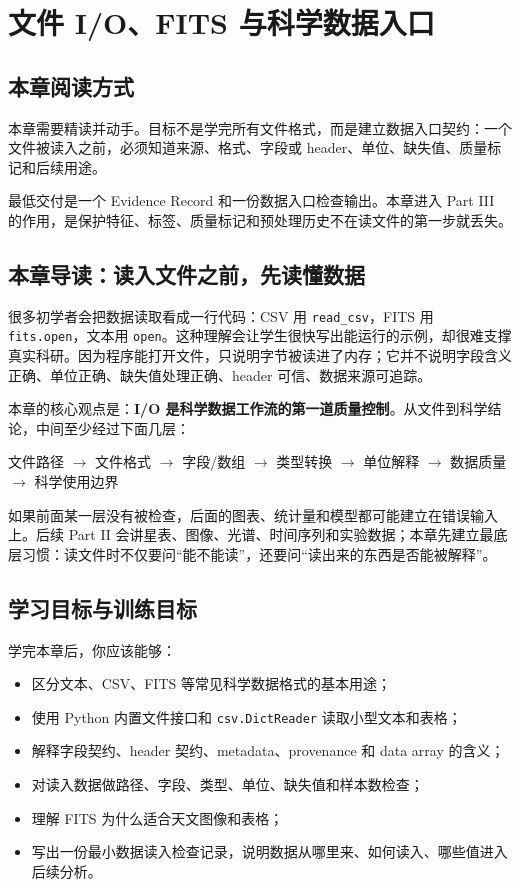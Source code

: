\chapter{文件 I/O、FITS 与科学数据入口}

\section{本章阅读方式}

本章需要精读并动手。目标不是学完所有文件格式，而是建立数据入口契约：一个文件被读入之前，必须知道来源、格式、字段或 header、单位、缺失值、质量标记和后续用途。

最低交付是一个 Evidence Record 和一份数据入口检查输出。本章进入 Part III 的作用，是保护特征、标签、质量标记和预处理历史不在读文件的第一步就丢失。

\section{本章导读：读入文件之前，先读懂数据}

很多初学者会把数据读取看成一行代码：CSV 用 \texttt{read\_csv}，FITS 用 \texttt{fits.open}，文本用 \texttt{open}。这种理解会让学生很快写出能运行的示例，却很难支撑真实科研。因为程序能打开文件，只说明字节被读进了内存；它并不说明字段含义正确、单位正确、缺失值处理正确、header 可信、数据来源可追踪。

本章的核心观点是：\textbf{I/O 是科学数据工作流的第一道质量控制}。从文件到科学结论，中间至少经过下面几层：

\begin{center}
文件路径 $\rightarrow$ 文件格式 $\rightarrow$ 字段/数组 $\rightarrow$ 类型转换 $\rightarrow$ 单位解释 $\rightarrow$ 数据质量 $\rightarrow$ 科学使用边界
\end{center}

如果前面某一层没有被检查，后面的图表、统计量和模型都可能建立在错误输入上。后续 Part II 会讲星表、图像、光谱、时间序列和实验数据；本章先建立最底层习惯：读文件时不仅要问“能不能读”，还要问“读出来的东西是否能被解释”。

\section{学习目标与训练目标}

学完本章后，你应该能够：

\begin{itemize}
    \item 区分文本、CSV、FITS 等常见科学数据格式的基本用途；
    \item 使用 Python 内置文件接口和 \texttt{csv.DictReader} 读取小型文本和表格；
    \item 解释字段契约、header 契约、metadata、provenance 和 data array 的含义；
    \item 对读入数据做路径、字段、类型、单位、缺失值和样本数检查；
    \item 理解 FITS 为什么适合天文图像和表格；
    \item 写出一份最小数据读入检查记录，说明数据从哪里来、如何读入、哪些值进入后续分析。
\end{itemize}

